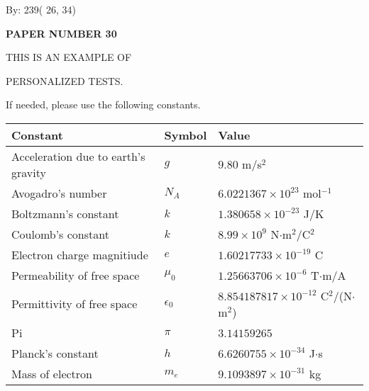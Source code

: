 \documentclass[12pt]{article}
\begin{document}
   
\hspace{1.0in} By: 
         239(         26,          34)
   
   
   
   
\newpage 
\setcounter{page}{ 
    30001 } 
   
   
   
   
 {\textbf{ \Large{ PAPER NUMBER          30 }}}
   
   
\vspace{0.2in}
   
   
   
   
   
   
   
   
 \vspace{0.2in}
 
 
{\Huge  THIS IS AN EXAMPLE OF}
 
{\Huge  PERSONALIZED TESTS. }
 
If needed, please use the following constants.
 
 
 
\noindent\begin{tabular}{|l|l|l|}
\hline
Constant & Symbol & Value \\
\hline
Acceleration due to earth's gravity &
$g$ &
 $ 9.80 $
m/s$^2$ \\
\hline
Avogadro's number &
$N_A$ &
 $ 6.0221367 \times 10^{23} $
mol$^{-1}$ \\
\hline
Boltzmann's constant &
$k$ &
 $ 1.380658 \times 10^{-23} $
J/K \\
\hline
Coulomb's constant &
$k$ &
 $ 8.99 \times 10^{9} $
N$\cdot $m$^2$/C$^2$ \\
\hline
Electron charge magnitiude &
$e$ &
 $ 1.60217733 \times 10^{-19} $
C \\
\hline
Permeability of free space &
$\mu _0$ &
 $ 1.25663706 \times 10^{-6} $
T$\cdot $m/A \\
\hline
Permittivity of free space &
$\epsilon _0$ &
 $ 8.854187817 \times 10^{-12} $
C$^2$/(N$\cdot $m$^2$) \\
\hline
Pi &
$\pi$ &
 $ 3.14159265 $
$ $ \\
\hline
Planck's constant &
$h$ &
 $ 6.6260755 \times 10^{-34} $
J$\cdot $s \\
\hline
Mass of electron &
$m_e$ &
 $ 9.1093897 \times 10^{-31} $
kg \\
\hline
\end{tabular}
 
\end{document}
